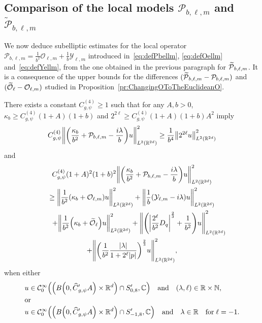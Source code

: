 \documentclass[AHL,Unicode,longabstracts]{cedram}
\newcommand{\C}{\mathbb{C}}
\newcommand{\R}{\mathbb{R}}
\newcommand{\N}{\mathbb{N}}
\newcommand{\clC}{\mathcal{C}}
\newcommand{\clY}{\mathcal{Y}}
\newcommand{\clO}{\mathcal{O}}
\newcommand{\clP}{\mathcal{P}}
\let\oldtilde\tilde
\renewcommand*{\tilde}[1]{\mathchoice{\widetilde{#1}}{\widetilde{#1}}{\oldtilde{#1}}{\oldtilde{#1}}}
\let\oldhat\hat
\renewcommand*{\hat}[1]{\mathchoice{\widehat{#1}}{\widehat{#1}}{\oldhat{#1}}{\oldhat{#1}}}
\let\originalleft\left
\let\originalright\right
\renewcommand{\left}{\mathopen{}\mathclose\bgroup\originalleft}
\renewcommand{\right}{\aftergroup\egroup\originalright}
\begin{document}
\subsection{Comparison of the local models \texorpdfstring{$\clP_{b,\ell,m}$}{P\_b,l,m} and \texorpdfstring{$\widetilde{\clP}_{b,\ell,m}$}{P\_b,l,m}}\label{subsec:compPbellmtPbellm}

We now deduce subelliptic estimates for the local operator $\clP_{b,\ell,m}=\frac{1}{b^2}\clO_{\ell,m}+\frac{1}{b}\clY_{\ell,m}$ introduced in~\eqref{eq:defPbellm}, \eqref{eq:defOellm} and~\eqref{eq:defYellm}, from the one obtained in the previous paragraph for $\tilde{\clP}_{b,\ell,m}$. It is a consequence of the upper bounds for the differences $(\tilde{\clP}_{b,\ell,m}-\clP_{b,\ell,m})$ and $(\tilde{\clO}_{\ell}-\clO_{\ell,m})$ studied in Proposition~\ref{pr:ChangingOToTheEuclideanO}.
\begin{prop}\label{pr:subellPbellm}
There exists a constant $C_{g,\psi}^{(4)}\geq 1$ such that for any $A,b>0$, $\kappa_b\geq C_{g,\psi}^{(4)}(1+A)(1+b)$ and $2^{2\ell}\geq C_{g,\psi}^{(4)}(1+A)(1+b)A^{2}$ imply
\begin{equation}\label{eq:subellPbellm1}
C_{g,\psi}^{(4)} \left\|\left(\frac{\kappa_b}{b^2}+\clP_{b,\ell,m}-\frac{i\lambda}{b}\right)u\right\|_{L^{2}(\R^{2d})}^2 \geq \frac{1}{b^4}\left\|2^{2\ell} u\right\|^2_{L^2(\R^{2d})}
\end{equation}
and
\begin{multline}\label{eq:subellPbellm2}
C_{g,\psi}^{(4)}(1+A)^2(1+b)^2
\left\| \left(\frac{\kappa_{b}}{b^{2}} + \clP_{b,\ell,m} - \frac{i\lambda}{b} \right) u \right\|_{L^2(\R^{2d})}^{2} \\
\geq \left\| \frac{1}{b^2}\left(\kappa_b+\clO_{\ell,m}\right) u\right\|_{L^2(\R^{2d})}^2 +
\left\| \frac{1}{b}\left(\clY_{\ell,m}-i \lambda \right)u \right\|_{L^2(\R^{2d})}^2
\\
\qquad+\left\| \frac{1}{b^2}\left(\kappa_b+\tilde{\clO}_{\ell}\right) u\right\|_{L^2(\R^{2d})}^2
+ \left\| \left(\left|\frac{2^{\ell}}{b^2}D_{q} \right|^{\frac{2}{3}} + \frac{1}{b^2}\right) u \right\|_{L^2(\R^{2d})}^{2}\\
+ \left\| \left(\frac{1}{b^2} \frac{|\lambda|}{1+2^{\ell}|p|} \right)^{\frac{2}{3}} u \right\|_{L^2(\R^{2d})}^{2} ,
\end{multline}
when either
\begin{align*}
&u \in \clC^\infty_0\left(\left(B\left(0,\hat{C}'_{g,\psi}A\right)\times \R^d\right)\cap S_{0,8}',\C\right)\quad\text{and}\quad (\lambda,\ell)\in \R\times \N,\\
\intertext{or}
&u \in \clC^\infty_0\left(\left(B\left(0,\hat{C}'_{g,\psi}A\right)\times \R^d\right)\cap S_{-1,8}',\C\right)\quad \text{and}\quad \lambda\in \R\quad\text{for}\; \ell=-1.
\end{align*}
\end{prop}
\end{document}
